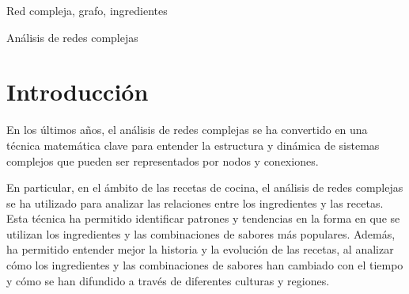 \documentclass[a4paper]{article}
\begin{document}
\begin{keywords}
	Red compleja, grafo, ingredientes
\end{keywords}

\begin{topics}
	Análisis de redes complejas
\end{topics}


\vspace{0.8cm}



\section{Introducción}\label{sec:intro}

En los últimos años, el análisis de redes complejas se ha convertido en una
técnica matemática clave para entender la estructura y dinámica de sistemas
complejos que pueden ser representados por nodos y conexiones.

En particular, en el ámbito de las recetas de cocina, el análisis de redes
complejas se ha utilizado para analizar las relaciones entre los ingredientes y
las recetas. Esta técnica ha permitido identificar patrones y tendencias en la
forma en que se utilizan los ingredientes y las combinaciones de sabores más
populares. Además, ha permitido entender mejor la historia y la evolución de las
recetas, al analizar cómo los ingredientes y las combinaciones de sabores han
cambiado con el tiempo y cómo se han difundido a través de diferentes culturas y
regiones.
\end{document}
